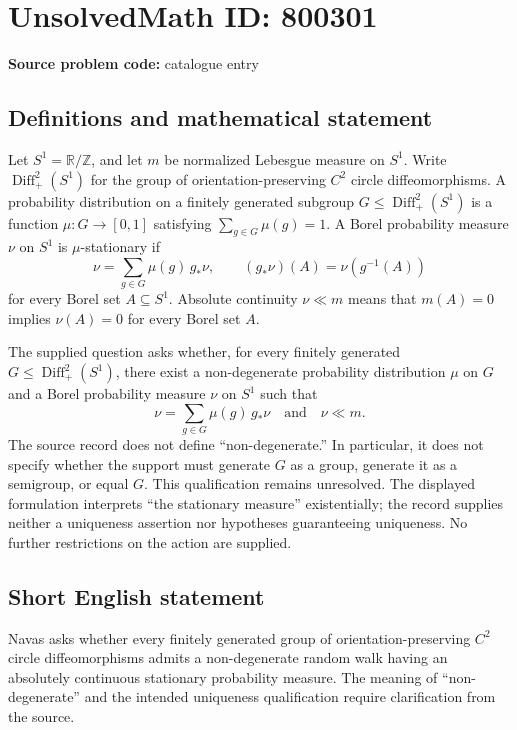 \documentclass[11pt]{article}
\newcommand{\Z}{\mathbb{Z}}
\newcommand{\R}{\mathbb{R}}
\begin{document}
\section*{UnsolvedMath ID: 800301}
\textbf{Source problem code:} catalogue entry
\subsection{Definitions and mathematical statement}
Let \(S^1=\R/\Z\), and let \(m\) be normalized Lebesgue measure on \(S^1\). Write \(\operatorname{Diff}^{2}_{+}(S^1)\) for the group of orientation-preserving \(C^2\) circle diffeomorphisms. A probability distribution on a finitely generated subgroup \(G\leq\operatorname{Diff}^{2}_{+}(S^1)\) is a function \(\mu:G\to[0,1]\) satisfying \(\sum_{g\in G}\mu(g)=1\). A Borel probability measure \(\nu\) on \(S^1\) is \(\mu\)-stationary if
\[
\nu=\sum_{g\in G}\mu(g)\,g_*\nu,
\qquad (g_*\nu)(A)=\nu(g^{-1}(A))
\]
for every Borel set \(A\subseteq S^1\). Absolute continuity \(\nu\ll m\) means that \(m(A)=0\) implies \(\nu(A)=0\) for every Borel set \(A\).

The supplied question asks whether, for every finitely generated \(G\leq\operatorname{Diff}^{2}_{+}(S^1)\), there exist a non-degenerate probability distribution \(\mu\) on \(G\) and a Borel probability measure \(\nu\) on \(S^1\) such that
\[
\nu=\sum_{g\in G}\mu(g)\,g_*\nu
\quad\text{and}\quad
\nu\ll m.
\]
The source record does not define ``non-degenerate.'' In particular, it does not specify whether the support must generate \(G\) as a group, generate it as a semigroup, or equal \(G\). This qualification remains unresolved. The displayed formulation interprets ``the stationary measure'' existentially; the record supplies neither a uniqueness assertion nor hypotheses guaranteeing uniqueness. No further restrictions on the action are supplied.
\subsection{Short English statement}
Navas asks whether every finitely generated group of orientation-preserving \(C^2\) circle diffeomorphisms admits a non-degenerate random walk having an absolutely continuous stationary probability measure. The meaning of ``non-degenerate'' and the intended uniqueness qualification require clarification from the source.
\end{document}
